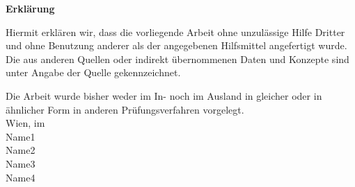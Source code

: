 \thispagestyle{empty}
\vspace*{2cm}
\begin{center}
{\bf \sf \huge Erkl{\"a}rung}
\end{center}
{\sf \vspace{1cm} Hiermit erkl{\"a}ren wir, dass die vorliegende
Arbeit ohne unzul{\"a}ssige Hilfe Dritter und ohne Benutzung
anderer als der angegebenen Hilfsmittel angefertigt wurde. Die aus
anderen Quellen oder indirekt übernommenen Daten und Konzepte sind
unter Angabe der Quelle gekennzeichnet.

Die Arbeit wurde bisher weder im In- noch im Ausland in gleicher
oder in {\"a}hnlicher Form in anderen Pr{\"u}fungsverfahren
vorgelegt.
\\[1.5cm]
Wien, im \monthdis
\\[2cm]
Name1
\\[2cm]
Name2
\\[2cm]
Name3
\\[2cm]
Name4
\\[2cm]
}%
